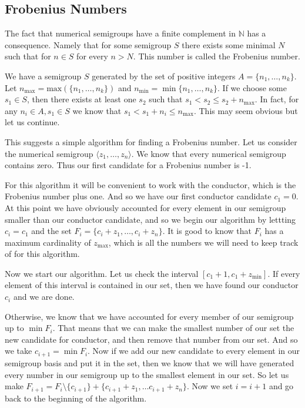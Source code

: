 \documentclass[11pt]{amsart}
\theoremstyle{plain}
\theoremstyle{definition}
\begin{document}
\subsection{Frobenius Numbers}
The fact that numerical semigroups have a finite complement in $\mathbb{N}$ has
a consequence. Namely that for some semigroup $S$ there exists some minimal $N$
such that for $n\in S$ for every  $n>N$. This number is called the Frobenius
number.

We have a semigroup $S$ generated by the set of positive integers
$A=\{ n_1,\dots,n_k\}$. Let $n_\text{max}=\text{max}(\{n_1,\dots,n_k\})$ and
$n_{\min{}}=\min{\{n_1,\dots,n_k\}}$. If we choose some $s_1\in S$, then
there exists at least one $s_2$ such that $s_1<s_2\le s_2+n_{\max{}}$. In
fact, for any $n_i\in A,s_1\in S$ we know that
$s_1<s_1+n_i\le n_\text{max}$. This may seem obvious but let us continue.

This suggests a simple algorithm for finding a Frobenius number. Let us consider the numerical semigroup $\langle z_1,\dots,z_n\rangle$. We know that every numerical semigroup contains zero. Thus our first candidate for a Frobenius number is -1.

For this algorithm it will be convenient to work with the conductor, which is the Frobenius number plus one.
And so we have our first conductor candidate $c_1=0$.
At this point we have obviously accounted for every element in our semigroup smaller than our conductor candidate, and so we begin our algorithm by lettting $c_i=c_1$ and the set $F_i=\{c_i+z_1,\dots,c_i+z_n\}$.
It is good to know that $F_i$ has a maximum cardinality of $z_\text{max}$, which is all the numbers we will need to keep track of for this algorithm.

Now we start our algorithm.
Let us check the interval $[c_1+1,c_1+z_\text{min}]$.
If every element of this interval is contained in our set, then we have found our conductor $c_i$ and we are done.

Otherwise, we know that we have accounted for every member of our semigroup up to $\min F_i$. That means that we can make the smallest number of our set the new candidate for conductor, and then remove that number from our set. And so we take $c_{i+1}=\min F_i$. Now if we add our new candidate to every element in our semigroup basis and put it in the set, then we know that we will have generated every number in our semigroup up to the smallest element in our set. So let us make $F_{i+1}=F_i\setminus \{c_{i+1}\} + \{c_{i+1}+z_1,\dots c_{i+1}+z_n\}$. Now we set $i=i+1$ and go back to the beginning of the algorithm.
\end{document}
